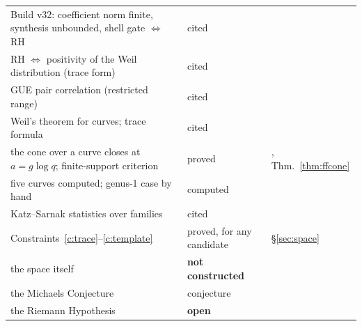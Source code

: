 \documentclass[11pt]{article}
\theoremstyle{definition}
\theoremstyle{remark}
\begin{document}
\begin{center}
\begin{tabular}{L{0.52\textwidth}L{0.2\textwidth}L{0.2\textwidth}}
Build v32: coefficient norm finite, synthesis unbounded, shell gate $\iff$ RH & cited & \cite{v32}\\
RH $\iff$ positivity of the Weil distribution (trace form) & cited & \cite{connes99}\\
GUE pair correlation (restricted range) & cited & \cite{montgomery}\\
Weil's theorem for curves; trace formula & cited & \cite{weil48,milneEC}\\
the cone over a curve closes at $a=g\log q$; finite-support criterion & proved & \cite{ffcone}, Thm.~\ref{thm:ffcone}\\
five curves computed; genus-1 case by hand & computed & \cite{ffcone,reading}\\
Katz--Sarnak statistics over families & cited & \cite{katzsarnak}\\
Constraints~\ref{c:trace}--\ref{c:template} & proved, for any candidate & \S\ref{sec:space}\\
the space itself & \textbf{not constructed} & \cite{deninger,cc16}\\
the Michaels Conjecture & conjecture & \cite{gstring}\\
the Riemann Hypothesis & \textbf{open} & \\
\bottomrule
\end{tabular}
\end{center}
\end{document}
